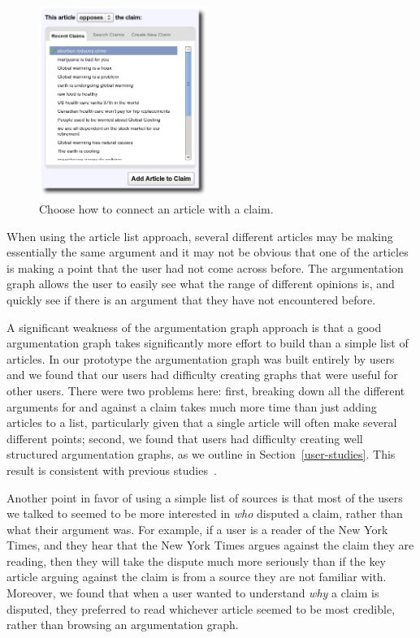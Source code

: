 \documentclass{www2010-accepted}
\newcommand{\todo}[1]{}
\begin{document}
\begin{figure}[tb]
	\begin{center}
	\includegraphics[width=5.5cm]{pictures/article_choose_claim.png}
	\caption{Choose how to connect an article with a claim.}
	\label{article_choose}
	\end{center}
\end{figure}

\todo{Call them supporting pages? Naming is a mess right now.}

When using the article list approach, several different articles may be making essentially the same argument and it may not be obvious that one of the articles is making a point that the user had not come across before. The argumentation graph allows the user to easily see what the range of different opinions is, and quickly see if there is an argument that they have not encountered before. 

A significant weakness of the argumentation graph approach is that a good argumentation graph takes significantly more effort to build than a simple list of articles. In our prototype the argumentation graph was built entirely by users and we found that our users had difficulty creating graphs that were useful for other users. There were two problems here: first, breaking down all the different arguments for and against a claim takes much more time than just adding articles to a list, particularly given that a single article will often make several different points; second, we found that users had difficulty creating well structured argumentation graphs, as we outline in Section~\ref{user-studies}. This result is consistent with previous studies~\cite{Isenmann1997}.

Another point in favor of using a simple list of sources is that most of the users we talked to seemed to be more interested in {\it who} disputed a claim, rather than what their argument was. For example, if a user is a reader of the New York Times, and they hear that the New York Times argues against the claim they are reading, then they will take the dispute much more seriously than if the key article arguing against the claim is from a source they are not familiar with. Moreover, we found that when a user wanted to understand {\it why} a claim is disputed, they preferred to read whichever article seemed to be most credible, rather than browsing an argumentation graph.
\end{document}
